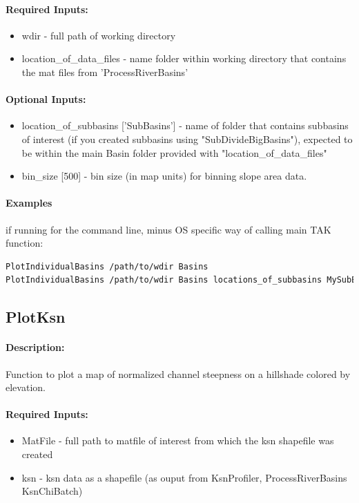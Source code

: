 \paragraph{Required Inputs:}
\begin{itemize}
\item wdir - full path of working directory
\item location\_of\_data\_files - name folder within working directory that contains the mat files from 'ProcessRiverBasins'
\end{itemize}

\paragraph{Optional Inputs:}
\begin{itemize}
\item location\_of\_subbasins ['SubBasins'] - name of folder that contains subbasins of interest (if you created subbasins using
"SubDivideBigBasins"), expected to be within the main Basin folder provided with "location\_of\_data\_files"
\item bin\_size [500] - bin size (in map units) for binning slope area data.
\end{itemize}

\paragraph{Examples} if running for the command line, minus OS specific way of calling main TAK function:
\begin{lstlisting}[language=bash]
PlotIndividualBasins /path/to/wdir Basins
PlotIndividualBasins /path/to/wdir Basins locations_of_subbasins MySubBasins
\end{lstlisting}

\subsection{PlotKsn}
\paragraph{Description:}
Function to plot a map of normalized channel steepness on a hillshade colored
by elevation.

\paragraph{Required Inputs:}
\begin{itemize}
\item MatFile - full path to matfile of interest from which the ksn shapefile was created
\item ksn - ksn data as a shapefile (as ouput from KsnProfiler, ProcessRiverBasins
KsnChiBatch)
\end{itemize}

